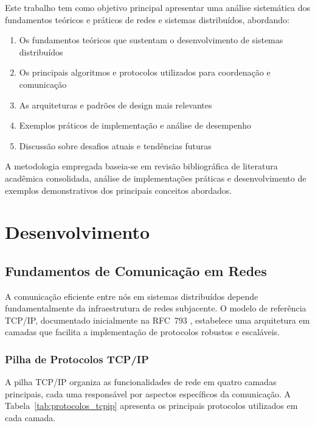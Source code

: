Este trabalho tem como objetivo principal apresentar uma análise sistemática dos fundamentos teóricos e práticos de redes e sistemas distribuídos, abordando:

\begin{enumerate}
    \item Os fundamentos teóricos que sustentam o desenvolvimento de sistemas distribuídos
    \item Os principais algoritmos e protocolos utilizados para coordenação e comunicação
    \item As arquiteturas e padrões de design mais relevantes
    \item Exemplos práticos de implementação e análise de desempenho
    \item Discussão sobre desafios atuais e tendências futuras
\end{enumerate}

A metodologia empregada baseia-se em revisão bibliográfica de literatura acadêmica consolidada, análise de implementações práticas e desenvolvimento de exemplos demonstrativos dos principais conceitos abordados.

\section{Desenvolvimento}

\subsection{Fundamentos de Comunicação em Redes}

A comunicação eficiente entre nós em sistemas distribuídos depende fundamentalmente da infraestrutura de redes subjacente. O modelo de referência TCP/IP, documentado inicialmente na RFC~793 \cite{rfc793:1981}, estabelece uma arquitetura em camadas que facilita a implementação de protocolos robustos e escaláveis.

\subsubsection{Pilha de Protocolos TCP/IP}

A pilha TCP/IP organiza as funcionalidades de rede em quatro camadas principais, cada uma responsável por aspectos específicos da comunicação. A Tabela~\ref{tab:protocolos_tcpip} apresenta os principais protocolos utilizados em cada camada.

